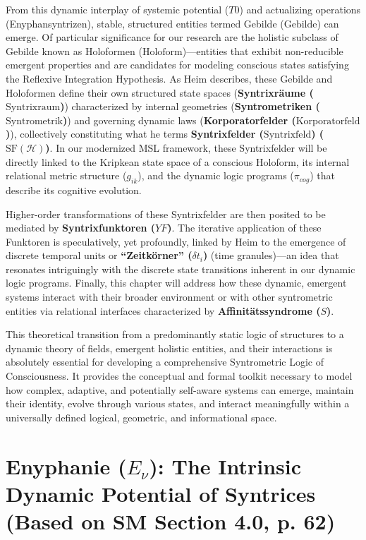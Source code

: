 \documentclass[
    12pt,              %
    a4paper,           %
    headings=normal,   %
    twoside=true,      %
    BCOR=8mm,          %
]{scrbook}
\newcommand{\q}[1]{\enquote{#1}}
\newcommand{\syntrixtotalitaet}{T0}
\newcommand{\syntrixfeld}{\text{Syntrixfeld}}
\newcommand{\syntrometrischesGebilde}{\text{Gebilde}}
\newcommand{\holoform}{\text{Holoform}}
\newcommand{\syntrixraum}{\text{Syntrixraum}}
\newcommand{\syntrometrik}{\text{Syntrometrik}}
\newcommand{\korporatorfeld}{\text{Korporatorfeld}}
\newcommand{\syntrixfunktor}{YF}
\newcommand{\zeitkorn}{\delta t_i}
\newcommand{\affinitaetssyndrom}{S}
\begin{document}
From this dynamic interplay of systemic potential (\(\syntrixtotalitaet\)) and actualizing operations (Enyphansyntrizen), stable, structured entities termed Gebilde (\(\syntrometrischesGebilde\)) can emerge. Of particular significance for our research are the holistic subclass of Gebilde known as Holoformen (\(\holoform\))—entities that exhibit non-reducible emergent properties and are candidates for modeling conscious states satisfying the Reflexive Integration Hypothesis. As Heim describes, these Gebilde and Holoformen define their own structured state spaces (\textbf{Syntrixräume (\(\syntrixraum\))}) characterized by internal geometries (\textbf{Syntrometriken (\(\syntrometrik\))}) and governing dynamic laws (\textbf{Korporatorfelder (\(\korporatorfeld\))}), collectively constituting what he terms \textbf{Syntrixfelder (\(\syntrixfeld\)) (\(\text{SF}(\mathcal{H})\))}. In our modernized MSL framework, these Syntrixfelder will be directly linked to the Kripkean state space of a conscious Holoform, its internal relational metric structure (\(g_{ik}\)), and the dynamic logic programs (\(\pi_{cog}\)) that describe its cognitive evolution.

Higher-order transformations of these Syntrixfelder are then posited to be mediated by \textbf{Syntrixfunktoren (\(\syntrixfunktor\))}. The iterative application of these Funktoren is speculatively, yet profoundly, linked by Heim to the emergence of discrete temporal units or \textbf{\q{Zeitkörner} (\(\zeitkorn\))} (time granules)—an idea that resonates intriguingly with the discrete state transitions inherent in our dynamic logic programs. Finally, this chapter will address how these dynamic, emergent systems interact with their broader environment or with other syntrometric entities via relational interfaces characterized by \textbf{Affinitätssyndrome (\(\affinitaetssyndrom\))}.

This theoretical transition from a predominantly static logic of structures to a dynamic theory of fields, emergent holistic entities, and their interactions is absolutely essential for developing a comprehensive Syntrometric Logic of Consciousness. It provides the conceptual and formal toolkit necessary to model how complex, adaptive, and potentially self-aware systems can emerge, maintain their identity, evolve through various states, and interact meaningfully within a universally defined logical, geometric, and informational space.

\section{Enyphanie (\(E_\nu\)): The Intrinsic Dynamic Potential of Syntrices (Based on SM Section 4.0, p. 62)}
\label{sec:ch4_enyphanie_overall} 
\end{document}
